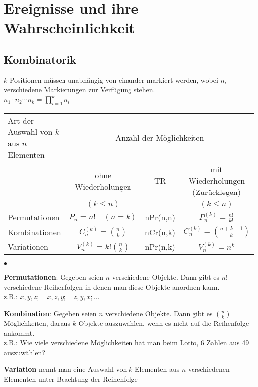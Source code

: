 \section{Ereignisse und ihre Wahrscheinlichkeit}

\subsection{Kombinatorik }
$k$ Positionen müssen unabhängig von einander markiert werden, wobei $n_i$ verschiedene Markierungen zur Verfügung stehen.\\
$n_1 \cdot n_2 \cdots n_k =  \prod_{i=1}^{k} n_i$\\
\begin{tabular}{| p{6cm} | c | c || c |}
  \hline
  Art der Auswahl von $k$ aus $n$ Elementen &
  \multicolumn{3}{c|}{Anzahl der Möglichkeiten} \\
  & ohne Wiederholungen & TR & mit Wiederholungen (Zurücklegen) \\
 	&	$(k\leq n)$   &      & $(k\leq n)$ \\
 	\hline
 	Permutationen & $P_n=n!\quad(n=k)$       & nPr(n,n) & $P_n^{(k)}=\frac{n!}{k!}$ \\
 	Kombinationen & $C_n^{(k)}=\binom n k$   & nCr(n,k) & $C_n^{(k)}=\binom{n+k-1} k$ \\
  Variationen   & $V_n^{(k)}=k!\binom n k$ & nPr(n,k) & $V_n^{(k)}=n^k$ \\
  \hline
\end{tabular}
\begin{list}{$\bullet$}{\setlength{\itemsep}{0cm} \setlength{\parsep}{0cm}
\setlength{\topsep}{0.1cm}}
  \item \textbf{Permutationen}: Gegeben seien $n$ verschiedene Objekte. Dann
    gibt es $n!$ verschiedene Reihenfolgen in denen man diese Objekte anordnen
    kann. \\
    z.B.: $x,y,z;\quad x,z,y;\quad z,y,x;\ldots$
  \item \textbf{Kombination}: Gegeben seien $n$ verschiedene Objekte. Dann gibt
    es $\binom n k$ Möglichkeiten, daraus $k$ Objekte auszuwählen, wenn es nicht
    auf die Reihenfolge ankommt. \\
    z.B.: Wie viele verschiedene Möglichkeiten hat man beim Lotto, 6 Zahlen aus
    49 auszuwählen?
  \item \textbf{Variation} nennt man eine Auswahl von $k$ Elementen aus $n$
    verschiedenen Elementen unter Beachtung der Reihenfolge
\end{list}
